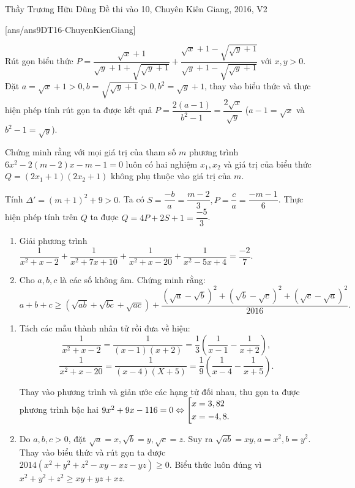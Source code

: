 \begin{name}
{Thầy  Trương Hữu Dũng}
{Đề thi vào 10, Chuyên Kiên Giang, 2016, V2}
\end{name}
\setcounter{ex}{0}
[ans/ans9DT16-ChuyenKienGiang]
\begin{ex}%
    Rút gọn biểu thức $P= \dfrac{\sqrt{x}+1}{\sqrt{y}+1 +\sqrt{\sqrt{y}+1}} + \dfrac{\sqrt{x}+1 -\sqrt{\sqrt{y}+1}}{\sqrt{y}+1-\sqrt{\sqrt{y}+1}}$ với $x , y >0.$
\loigiai
    {
    Đặt $a = \sqrt{x}+1 > 0, b= \sqrt{\sqrt{y}+1} > 0, b^2= \sqrt{y}+1$, thay vào biểu thức và thực hiện phép tính rút gọn ta được kết quả $P=\dfrac{2(a-1)}{b^2-1}= \dfrac{2 \sqrt{x}}{\sqrt{y}}$ ($a-1=\sqrt{x}$ và $b^2-1=\sqrt{y}$).
    }
\end{ex}

\begin{ex}%
Chứng minh rằng với mọi giá trị của tham số $m$ phương trình $6x^2-2(m-2)x-m-1=0$ luôn có hai nghiệm $x_1,x_2$ và giá trị của biểu thức $Q= (2x_1+1)(2x_2+1)$ không phụ thuộc vào giá trị của $m$.
\loigiai
    {Tính $\Delta'=(m+1)^2+9 > 0$. Ta có $S = \dfrac{-b}{a} =\dfrac{m-2}{3}, P= \dfrac{c}{a}= \dfrac{-m-1}{6}$. Thực hiện phép tính trên $Q$ ta được $Q=4P+2S+1 = \dfrac{-5}{3}$.
    
    }
\end{ex}

\begin{ex}%
   \hfill
    \begin{enumerate}
        \item Giải phương trình
        $\dfrac{1}{x^2+x-2} + \dfrac{1}{x^2+7x+10} + \dfrac{1}{x^2+x-20}+ \dfrac{1}{x^2-5x+4} = \dfrac{-2}{7}.$
        \item Cho $a,b,c$ là các số không âm. Chứng minh rằng:
        $$a+b+c \ge \left(\sqrt{ab}+ \sqrt{bc}+\sqrt{ac} \right) +\dfrac{\left(\sqrt{a}-\sqrt{b}\right)^2 + \left(\sqrt{b}-\sqrt{c}\right)^2+\left(\sqrt{c}-\sqrt{a}\right)^2}{2016}.$$
    \end{enumerate}
\loigiai
    {
    	\hfill
    	\begin{enumerate}
    		\item Tách các mẫu thành nhân tử rồi đưa về hiệu: $$\dfrac{1}{x^2+x-2}=\dfrac{1}{(x-1)(x+2)} =\dfrac{1}{3} \left(\dfrac{1}{x-1}-\dfrac{1}{x+2}\right),$$
    		$$\dfrac{1}{x^2+x-20}=\dfrac{1}{(x-4)(X+5)}=\dfrac{1}{9}\left(\dfrac{1}{x-4}-\dfrac{1}{x+5}\right).$$
    		
    		Thay vào phương trình và giản ước các hạng tử đối nhau, thu gọn ta được phương trình bậc hai $9x^2+9x-116=0 \Leftrightarrow \left[\begin{aligned}&x=3,82\\&x=-4,8.\end{aligned}\right.$
    		\item Do $a,b,c >0$, đặt $\sqrt{a}=x,\sqrt{b}=y,\sqrt{c}=z$. Suy ra $\sqrt{ab}=xy,a=x^2,b=y^2$. Thay vào biểu thức và rút gọn ta được $2014 \left(x^2+y^2+z^2-xy-xz-yz\right) \ge 0.$ Biểu thức luôn đúng vì $x^2+y^2+z^2 \ge xy+yz+xz$.
    	\end{enumerate}
   
    }
\end{ex}

